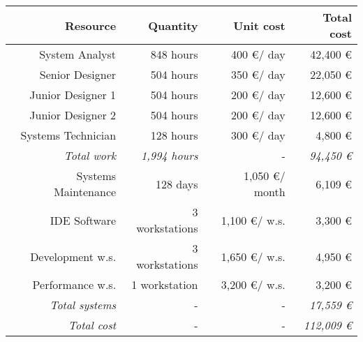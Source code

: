 \begin{tabular}{r|rr|r}
\textbf{Resource} & \textbf{Quantity} & \textbf{Unit cost} & \textbf{Total cost} \\ \hline
System Analyst & 848 hours & 400 \euro / day & 42,400 \euro \\
Senior Designer & 504 hours & 350 \euro / day & 22,050 \euro \\
Junior Designer 1 & 504 hours & 200 \euro / day & 12,600 \euro \\
Junior Designer 2 & 504 hours & 200 \euro / day & 12,600 \euro \\
Systems Technician & 128 hours & 300 \euro / day & 4,800 \euro \\ \hline
\textit{Total work} & \textit{1,994 hours} & - & \textit{94,450 \euro} \\ \hline \hline
Systems Maintenance & 128 days & 1,050 \euro / month & 6,109 \euro \\
IDE Software & 3 workstations & 1,100 \euro / w.s. & 3,300 \euro \\
Development w.s. & 3 workstations & 1,650 \euro / w.s. & 4,950 \euro \\
Performance w.s. & 1 workstation & 3,200 \euro / w.s. & 3,200 \euro \\ \hline
\textit{Total systems} & - & - & \textit{17,559 \euro} \\ \hline \hline
\textit{Total cost} & - & - & \textit{112,009 \euro}

\end{tabular}

